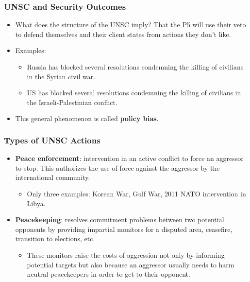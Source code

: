 \documentclass{beamer}
\begin{document}
\begin{frame} 
	\frametitle{\LARGE{UNSC and Security Outcomes}}
	\begin{itemize}
		\item What does the structure of the UNSC imply? \pause That the P5 will use their veto to defend themselves and their client states from actions they don't like. \pause
		\item Examples:
		\begin{itemize}
			\item Russia has blocked several resolutions condemning the killing of civilians in the Syrian civil war. \pause
			\item US has blocked several resolutions condemning the killing of civilians in the Israeli-Palestinian conflict. \pause
		\end{itemize}
	\item This general phenomenon is called \textbf{policy bias}. 
	\end{itemize}
\end{frame}

\begin{frame} 
	\frametitle{\LARGE{Types of UNSC Actions}}
	\begin{itemize}
		\item \textbf{Peace enforcement}: intervention in an active conflict to force an aggressor to stop. This authorizes the use of force against the aggressor by the international community. \pause
		\begin{itemize}
			\item Only three examples: Korean War, Gulf War, 2011 NATO intervention in Libya. \pause
		\end{itemize}
		\item \textbf{Peacekeeping}: resolves commitment problems between two potential opponents by providing impartial monitors for a disputed area, ceasefire, transition to elections, etc. \pause
		\begin{itemize}
			\item These monitors raise the costs of aggression not only by informing potential targets but also because an aggressor usually needs to harm neutral peacekeepers in order to get to their opponent. \pause
		\end{itemize}
	\end{itemize}
\end{frame}
\end{document}
